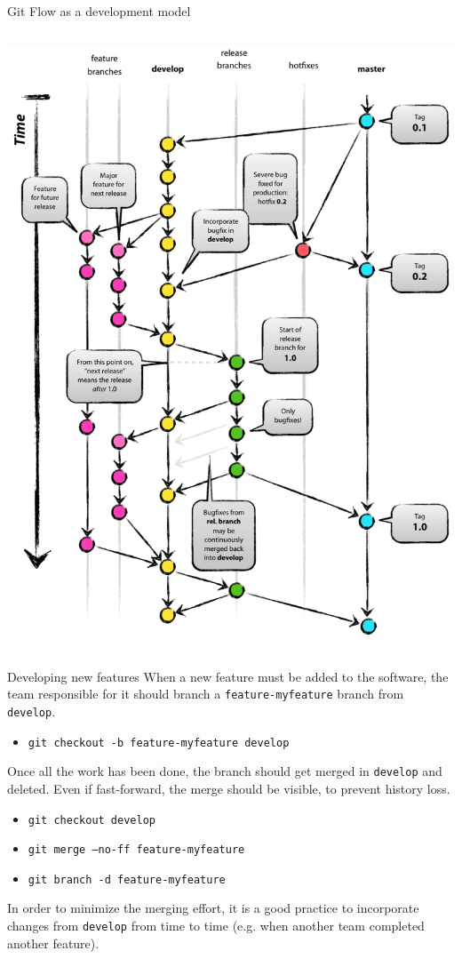\documentclass[presentation]{beamer}
\begin{document}
\begin{frame}[fragile]{Git Flow as a development model}
\begin{columns}
\begin{column}{.47\textwidth}
\begin{center}
				\includegraphics[width=\textwidth]{img/gitflow}
			\end{center}
		\end{column}
	\end{columns}
\end{frame}

\begin{frame}[fragile]{Developing new features}
	When a new feature must be added to the software, the team responsible for it should branch a \texttt{feature-myfeature} branch from \texttt{develop}.
	\begin{itemize}
		\item \texttt{git checkout -b feature-myfeature develop}
	\end{itemize}
	Once all the work has been done, the branch should get merged in \texttt{develop} and deleted. Even if fast-forward, the merge should be visible, to prevent history loss.
	\begin{itemize}
		\item \texttt{git checkout develop}
		\item \texttt{git merge --no-ff feature-myfeature}
		\item \texttt{git branch -d feature-myfeature}
	\end{itemize}
	In order to minimize the merging effort, it is a good practice to incorporate changes from \texttt{develop} from time to time (e.g. when another team completed another feature).
\end{frame}
\end{document}
